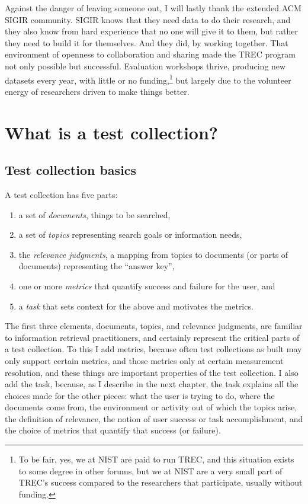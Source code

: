 \documentclass[nobib]{tufte-book}
\begin{document}
Against the danger of leaving someone out, I will lastly thank the extended ACM SIGIR community.  SIGIR knows that they need data to do their research, and they also know from hard experience that no one will give it to them, but rather they need to build it for themselves.  And they did, by working together.  That environment of openness to collaboration and sharing made the TREC program not only possible but successful.  Evaluation workshops thrive, producing new datasets every year, with little or no funding,\footnote{To be fair, yes, we at NIST are paid to run TREC, and this situation exists to some degree in other forums, but we at NIST are a very small part of TREC's success compared to the researchers that participate, usually without funding.} but largely due to the volunteer energy of researchers driven to make things better.
\mainmatter

\chapter{What is a test collection?}

\section{Test collection basics}

A test collection has five parts:
\begin{enumerate}
    \item a set of {\it documents}, things to be searched,
    \item a set of {\it topics} representing search goals or information needs,
    \item the {\it relevance judgments}, a mapping from topics to documents (or parts of documents) representing the ``answer key'',
    \item one or more {\it metrics} that quantify success and failure for the user, and
    \item a {\it task} that sets context for the above and motivates the metrics.
\end{enumerate}

The first three elements, documents, topics, and relevance judgments, are familiar to information retrieval practitioners, and certainly represent the critical parts of a test collection.  To this I add metrics, because often test collections as built may only support certain metrics, and those metrics only at certain measurement resolution, and these things are important properties of the test collection.  I also add the task, because, as I describe in the next chapter, the task explains all the choices made for the other pieces: what the user is trying to do, where the documents come from, the environment or activity out of which the topics arise, the definition of relevance, the notion of user success or task accomplishment, and the choice of metrics that quantify that success (or failure).
\end{document}
